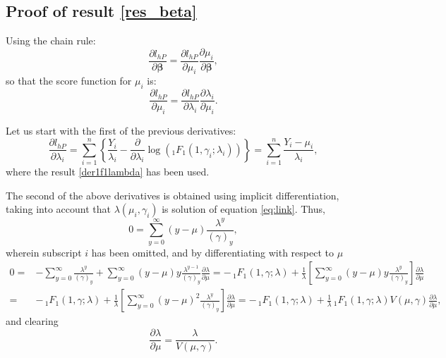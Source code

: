 \subsection{Proof of result \ref{res_beta}}

Using the chain rule:
$$ \frac{\partial l_{hP}}{\partial \boldsymbol{\beta}} = \frac{\partial l_{hP}}{\partial \mu_i} \frac{\partial \mu_i}{\partial \boldsymbol{\beta}}, $$
so that the score function for $\mu_i$ is:
$$ \frac{\partial l_{hP}}{\partial \mu_i} = \frac{\partial l_{hP}}{\partial \lambda_i} \frac{\partial \lambda_i}{\partial \mu_i}. $$

Let us start with the first of the previous derivatives:
\begin{equation}\label{scorelambda}
    \frac{\partial l_{hP}}{\partial \lambda_i} = \sum_{i=1}^n \left\{ \frac{Y_i}{\lambda_i} -  \frac{\partial}{\partial \lambda_i} \log \left(_{1}F_{1}\left(1, \gamma_i; \lambda_i \right) \right) \right\} = \sum_{i=1}^n \frac{Y_i - \mu_i}{\lambda_i},
\end{equation}
where the result \eqref{der1f1lambda} has been used.

The second of the above derivatives is obtained using implicit differentiation, taking into account that $ \lambda(\mu_i, \gamma_i) $ is solution of equation \eqref{eq:link}. Thus,
$$ 0=\sum_{y=0}^{\infty} \left(y-\mu\right) \frac{\lambda^{y}}{\left(\gamma\right)_{y}}, $$
wherein subscript $i$ has been omitted, and by differentiating with respect to $\mu$
\begin{align*}
    0 = & - \sum_{y=0}^{\infty} \frac{\lambda^{y}}{\left(\gamma\right)_{y}} + \sum_{y=0}^{\infty} \left(y-\mu\right) y \frac{\lambda^{y-1}}{\left(\gamma\right)_{y}} \frac{\partial \lambda}{\partial \mu} = - \, _{1}F_{1}\left(1, \gamma; \lambda \right) + \frac{1}{\lambda} \left[ \sum_{y=0}^{\infty} \left(y-\mu\right) y \frac{\lambda^{y}}{\left(\gamma\right)_{y}} \right] \frac{\partial \lambda}{\partial \mu} \\
    = & - \, _{1}F_{1}\left(1, \gamma; \lambda \right) + \frac{1}{\lambda} \left[ \sum_{y=0}^{\infty} \left(y-\mu\right)^2 \frac{\lambda^{y}}{\left(\gamma\right)_{y}} \right] \frac{\partial \lambda}{\partial \mu} = - \, _{1}F_{1}\left(1, \gamma; \lambda \right) + \frac{1}{\lambda} \, _{1}F_{1}\left(1, \gamma; \lambda \right) V\left(\mu,\gamma\right) \frac{\partial \lambda}{\partial \mu},
\end{align*}
and clearing
\begin{equation}\label{derlambdamu}
    \frac{\partial \lambda}{\partial \mu} = \frac{\lambda}{V\left(\mu,\gamma\right)}.
\end{equation}

